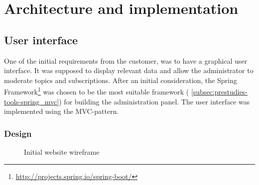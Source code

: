
\chapter{Architecture and implementation}
\label{ch:architecture_and_implementation}

\section{User interface}
\label{sec:architecture_and_implementation-user_interface}

One of the initial requirements from the customer, was to have a graphical user interface. It was supposed to display relevant data and allow the administrator to moderate topics and subscriptions. After an initial consideration, the Spring Framework\footnote{\url{http://projects.spring.io/spring-boot/}} was chosen to be the most suitable framework ( \ref{subsec:prestudies-tools-spring_mvc}) for building the administration panel. The user interface was implemented using the MVC-pattern. 

\subsection{Design}
\label{subsec:architecture_and_implementation-user_interface-design}

\begin{center}
  \begin{figure}[ht!]
    \caption{Initial website wireframe}
    \label{fig:initial_prototype}
  \end{figure}
\end{center}

